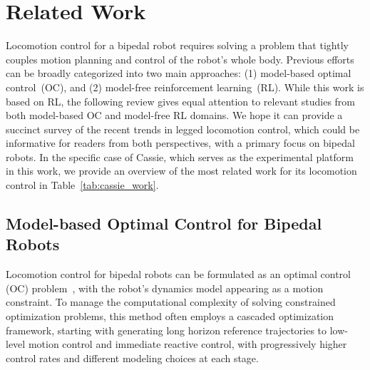 \section{Related Work}\label{sec:review}
Locomotion control for a bipedal robot requires solving a problem that tightly couples motion planning and control of the robot's whole body. 
Previous efforts can be broadly categorized into two main approaches: (1) model-based optimal control~(OC), and (2) model-free reinforcement learning~(RL). 
While this work is based on RL, the following review gives equal attention to relevant studies from both model-based OC and model-free RL domains. 
We hope it can provide a succinct survey of the recent trends in legged locomotion control, which could be informative for readers from both perspectives, with a primary focus on bipedal robots.
In the specific case of Cassie, which serves as the experimental platform in this work, we provide an overview of the most related work for its locomotion control in Table~\ref{tab:cassie_work}.





\subsection{Model-based Optimal Control for Bipedal Robots}
Locomotion control for bipedal robots can be formulated as an optimal control (OC) problem~\cite[Eq.~(1)]{wensing2022optimization}, with the robot's dynamics model appearing as a motion constraint. 
To manage the computational complexity of solving constrained optimization problems, this method often employs a cascaded optimization framework, starting with generating long horizon reference trajectories to low-level motion control and immediate reactive control, with progressively higher control rates and different modeling choices at each stage.

